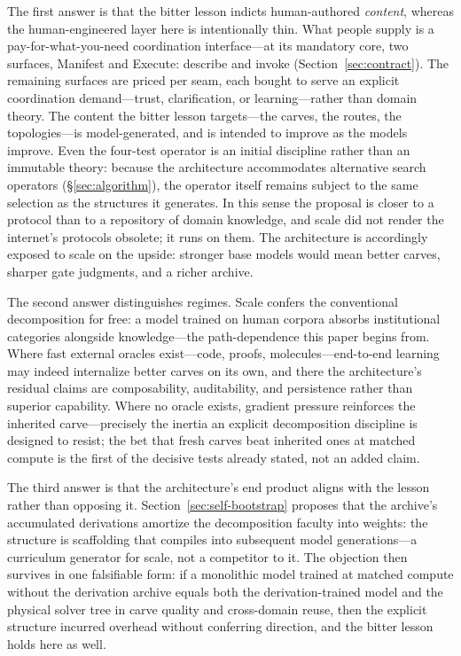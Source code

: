 \documentclass[11pt]{article}
\begin{document}
The first answer is that the bitter lesson indicts human-authored
\emph{content}, whereas the human-engineered layer here is intentionally
thin. What people supply is a pay-for-what-you-need coordination
interface---at its mandatory core, two surfaces, Manifest and Execute:
describe and invoke (Section~\ref{sec:contract}). The remaining surfaces
are priced per seam, each bought to serve an explicit coordination
demand---trust, clarification, or learning---rather than domain theory.
The content the bitter lesson targets---the carves, the routes, the
topologies---is model-generated, and is intended to improve as the models
improve. Even the four-test operator is an initial discipline rather than
an immutable theory: because the architecture accommodates alternative
search operators (\S\ref{sec:algorithm}), the operator itself remains
subject to the same selection as the structures it generates. In this
sense the proposal is closer to a protocol than to a repository of domain
knowledge, and scale did not render the internet's protocols obsolete; it
runs on them. The architecture is accordingly exposed to scale on the
upside: stronger base models would mean better carves, sharper gate
judgments, and a richer archive.

The second answer distinguishes regimes. Scale confers the conventional
decomposition for free: a model trained on human corpora absorbs
institutional categories alongside knowledge---the path-dependence this
paper begins from. Where fast external oracles exist---code, proofs,
molecules---end-to-end learning may indeed internalize better carves on
its own, and there the architecture's residual claims are composability,
auditability, and persistence rather than superior capability. Where no
oracle exists, gradient pressure reinforces the inherited
carve---precisely the inertia an explicit decomposition discipline is
designed to resist; the bet that fresh carves beat inherited ones at
matched compute is the first of the decisive tests already stated, not an
added claim.

The third answer is that the architecture's end product aligns with the
lesson rather than opposing it. Section~\ref{sec:self-bootstrap} proposes
that the archive's accumulated derivations amortize the decomposition
faculty into weights: the structure is scaffolding that compiles into
subsequent model generations---a curriculum generator for scale, not a
competitor to it. The objection then survives in one falsifiable form: if
a monolithic model trained at matched compute without the derivation
archive equals both the derivation-trained model and the physical solver
tree in carve quality and cross-domain reuse, then the explicit structure
incurred overhead without conferring direction, and the bitter lesson
holds here as well.
\end{document}
